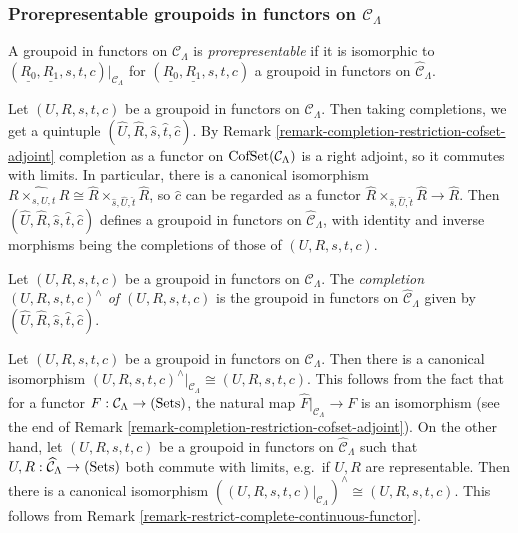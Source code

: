 \subsubsection{Prorepresentable groupoids in functors on $\mathcal C_{\Lambda}$}
\begin{definition}
A groupoid in functors on $\mathcal C_{\Lambda}$ is \emph{prorepresentable} if 
it is isomorphic to $(\underline{R_0}, \underline{R_1}, s,t,c)|_{\mathcal 
C_{\Lambda}}$ for $(\underline{R_0}, \underline{R_1}, s,t,c)$ a groupoid in 
functors on $\widehat{\mathcal C}_{\Lambda}$.
\end{definition}

\noindent
Let $(U,R,s,t,c)$ be a groupoid in functors on $\mathcal C_{\Lambda}$.  Then 
taking completions, we get a quintuple $(\widehat{U}, \widehat{R}, \widehat{s}, 
\widehat{t}, \widehat{c})$.  By Remark 
\ref{remark-completion-restriction-cofset-adjoint} completion as a functor on 
$\textnormal{CofSet}(\mathcal C_{\Lambda})$ is a right adjoint, so it commutes 
with limits.  In particular, there is a canonical isomorphism $\widehat{R 
\times_{s,U,t} R} \cong \widehat{R} \times_{\widehat{s}, \widehat{U}, 
\widehat{t}} \widehat{R}$, so $\widehat{c}$ can be regarded as a functor 
$\widehat{R} \times_{\widehat{s}, \widehat{U}, \widehat{t}} \widehat{R} 
\rightarrow \widehat{R}$.  Then $(\widehat{U}, \widehat{R}, \widehat{s}, 
\widehat{t}, \widehat{c})$ defines a groupoid in functors on $\widehat{\mathcal 
C}_{\Lambda}$, with identity and inverse morphisms being the completions of 
those of $(U,R,s,t,c)$.

\begin{definition}
Let $(U,R,s,t,c)$ be a groupoid in functors on $\mathcal C_{\Lambda}$.  The 
\emph{completion $(U,R,s,t,c)^{\wedge}$ of $(U,R,s,t,c)$} is the groupoid in 
functors on $\widehat{\mathcal C}_{\Lambda}$ given by 
$(\widehat{U},\widehat{R},\widehat{s},\widehat{t},\widehat{c})$.
\end{definition}

\begin{remark}
\label{remark-groupoid-in-functors-complete-restrict}
Let $(U,R,s,t,c)$ be a groupoid in functors on $\mathcal C_{\Lambda}$. Then 
there is a canonical isomorphism $(U,R,s,t,c)^{\wedge}|_{\mathcal C_{\Lambda}} 
\cong (U,R,s,t,c)$.  This follows from the fact that for a functor $F: \mathcal 
C_{\Lambda} \rightarrow \textnormal{(Sets)}$, the natural map 
$\widehat{F}|_{\mathcal C_{\Lambda}} \rightarrow F$ is an isomorphism (see the 
end of Remark \ref{remark-completion-restriction-cofset-adjoint}).  On the 
other hand, let $(U,R,s,t,c)$ be a groupoid in functors on $\widehat{\mathcal 
C}_{\Lambda}$ such that $U, R: \widehat{\mathcal C}_{\Lambda} \rightarrow 
\textnormal{(Sets)}$ both commute with limits, e.g.\ if $U,R$ are 
representable. Then there is a canonical isomorphism $((U,R,s,t,c)|_{\mathcal 
C_{\Lambda}})^{\wedge} \cong (U,R,s,t,c)$. This follows from Remark 
\ref{remark-restrict-complete-continuous-functor}.
\end{remark}

